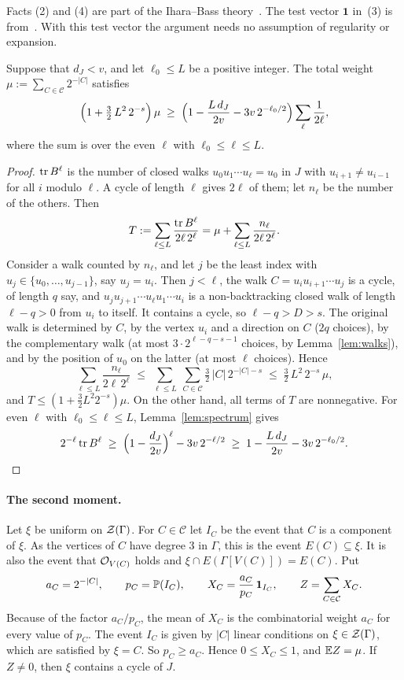 Facts (2) and (4) are part of the Ihara--Bass theory~\cite{Bass,KS}. The test vector $\mathbf{1}$
in~(3) is from~\cite{KNT}. With this test vector the argument needs no assumption of regularity
or expansion.

\begin{lemma}\label{lem:weight}
Suppose that $d_J<v$, and let $\ell_0\le L$ be a positive integer. The total weight
$\mu:=\sum_{C\in\mathcal{C}}2^{-|C|}$ satisfies
\[
  \Bigl(1+\tfrac32\,L^{2}\,2^{-s}\Bigr)\,\mu\;\ge\;
  \Bigl(1-\frac{L\,d_J}{2v}-3v\,2^{-\ell_0/2}\Bigr)\sum_{\ell}\frac1{2\ell},
\]
where the sum is over the even $\ell$ with $\ell_0\le\ell\le L$.
\end{lemma}

\begin{proof}
$\operatorname{tr} B^{\ell}$ is the number of closed walks $u_0u_1\cdots u_\ell=u_0$ in $J$ with
$u_{i+1}\ne u_{i-1}$ for all $i$ modulo $\ell$. A cycle of length $\ell$ gives $2\ell$ of them; let
$n_\ell$ be the number of the others. Then
\[
  T:=\sum_{\ell\le L}\frac{\operatorname{tr} B^{\ell}}{2\ell\,2^{\ell}}=\mu+\sum_{\ell\le L}\frac{n_\ell}{2\ell\,2^{\ell}} .
\]
Consider a walk counted by $n_\ell$, and let $j$ be the least index with
$u_j\in\{u_0,\dots,u_{j-1}\}$, say $u_j=u_i$. Then $j<\ell$, the walk $C=u_iu_{i+1}\cdots u_j$ is a
cycle, of length $q$ say, and $u_ju_{j+1}\cdots u_\ell u_1\cdots u_i$ is a non-backtracking closed
walk of length $\ell-q>0$ from $u_i$ to itself. It contains a cycle, so $\ell-q>D>s$. The original
walk is determined by $C$, by the vertex $u_i$ and a direction on $C$ ($2q$ choices), by the
complementary walk (at most $3\cdot2^{\ell-q-s-1}$ choices, by Lemma~\ref{lem:walks}), and by the
position of $u_0$ on the latter (at most $\ell$ choices). Hence
\[
  \sum_{\ell\le L}\frac{n_\ell}{2\ell\,2^{\ell}}
  \;\le\;\sum_{\ell\le L}\ \sum_{C\in\mathcal{C}}\tfrac32\,|C|\,2^{-|C|-s}
  \;\le\;\tfrac32\,L^{2}\,2^{-s}\,\mu ,
\]
and $T\le(1+\frac32L^{2}2^{-s})\mu$. On the other hand, all terms of $T$ are nonnegative. For even
$\ell$ with $\ell_0\le\ell\le L$, Lemma~\ref{lem:spectrum} gives
\[
  2^{-\ell}\operatorname{tr} B^{\ell}\;\ge\;\Bigl(1-\frac{d_J}{2v}\Bigr)^{\ell}-3v\,2^{-\ell/2}
  \;\ge\;1-\frac{L\,d_J}{2v}-3v\,2^{-\ell_0/2}.\qedhere
\]
\end{proof}

\paragraph{The second moment.}
Let $\xi$ be uniform on $\mathcal{Z}(\Gamma)$. For $C\in\mathcal{C}$ let $I_C$ be the event that $C$ is a
component of $\xi$. As the vertices of $C$ have degree $3$ in $\Gamma$, this is the event
$E(C)\subseteq\xi$. It is also the event that $\mathcal{O}_{V(C)}$ holds and
$\xi\cap E(\Gamma[V(C)])=E(C)$. Put
\[
  a_C=2^{-|C|},\qquad p_C=\mathbb{P}(I_C),\qquad X_C=\frac{a_C}{p_C}\,\mathbf{1}_{I_C},\qquad
  Z=\sum_{C\in\mathcal{C}}X_C .
\]
Because of the factor $a_C/p_C$, the mean of $X_C$ is the combinatorial weight $a_C$ for every
value of $p_C$. The event $I_C$ is given by $|C|$ linear conditions on $\xi\in\mathcal{Z}(\Gamma)$,
which are satisfied by $\xi=C$. So $p_C\ge a_C$. Hence $0\le X_C\le1$, and $\mathbb{E} Z=\mu$. If
$Z\ne0$, then $\xi$ contains a cycle of $J$.

